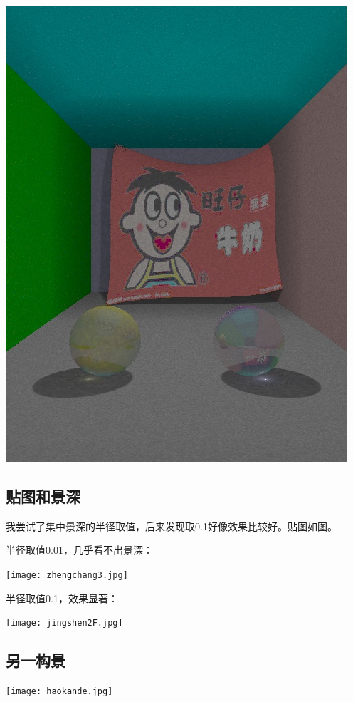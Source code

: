 \documentclass[10pt, a4paper]{article}
\begin{document}
      \includegraphics[scale = .6]{wangzai2.jpg}

    \subsection{贴图和景深}

      我尝试了集中景深的半径取值，后来发现取0.1好像效果比较好。贴图如图。

      半径取值0.01，几乎看不出景深：

      \texttt{[image: zhengchang3.jpg]}

      半径取值0.1，效果显著：

      \texttt{[image: jingshen2F.jpg]}

    \subsection{另一构景}
      \texttt{[image: haokande.jpg]}
\end{document}
